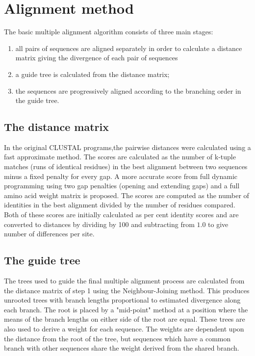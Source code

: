 \section{Alignment method}
The basic multiple alignment algorithm consists of three main stages:
\begin{enumerate}
\item all pairs of sequences are aligned separately in order to calculate a distance matrix giving the divergence of each pair of sequences
\item a guide tree is calculated  from the distance matrix;
\item the sequences are progressively aligned according to the branching order in the guide tree.
\end{enumerate}

\subsection{The distance matrix}
In the original CLUSTAL programs,the pairwise distances were calculated using a fast approximate method.
The scores are calculated as the number of k-tuple matches (runs of identical residues) in the best alignment between two sequences minus a fixed penalty for every gap.
A more accurate score from full dynamic programming using two gap penalties (opening and extending gaps) and a full amino acid weight matrix is proposed.
The scores are computed as the number of identities in the best alignment divided by the number of residues compared.
Both of these scores are initially calculated as per cent identity scores and are converted to distances by dividing by 100 and subtracting from $1.0$ to give number of differences per site.

\subsection{The guide tree}
The trees used to guide the final multiple alignment process are calculated from the distance matrix of step 1 using the Neighbour-Joining method.  This produces unrooted trees with branch lengths proportional to estimated divergence along each branch. The root is placed by a "mid-point" method at a position where the means of the branch lengths on either side of the root are equal. These trees are  also used to derive a weight for each sequence.  The weights are dependent upon the distance from the  root of  the tree, but sequences which have a common branch with other sequences share the weight derived from the shared branch.

